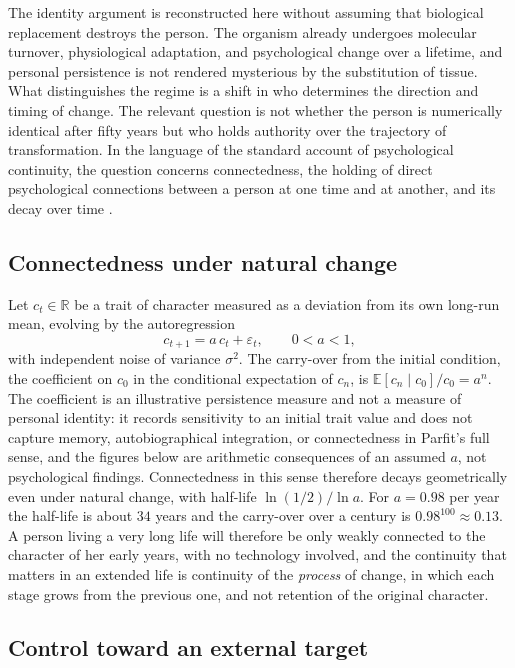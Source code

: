 \documentclass[11pt]{article}
\theoremstyle{plain}
\theoremstyle{definition}
\theoremstyle{remark}
\newcommand{\E}{\mathbb{E}}
\newcommand{\R}{\mathbb{R}}
\begin{document}
The identity argument is reconstructed here without assuming that biological replacement destroys the person. The organism already undergoes molecular turnover, physiological adaptation, and psychological change over a lifetime, and personal persistence is not rendered mysterious by the substitution of tissue. What distinguishes the regime is a shift in who determines the direction and timing of change. The relevant question is not whether the person is numerically identical after fifty years but who holds authority over the trajectory of transformation. In the language of the standard account of psychological continuity, the question concerns connectedness, the holding of direct psychological connections between a person at one time and at another, and its decay over time \cite{parfit1984}.

\subsection{Connectedness under natural change}

Let $c_t\in\R$ be a trait of character measured as a deviation from its own long-run mean, evolving by the autoregression
\begin{equation}\label{eq:ar1}
c_{t+1}=a\,c_t+\varepsilon_t,\qquad 0<a<1,
\end{equation}
with independent noise of variance $\sigma^2$. The carry-over from the initial condition, the coefficient on $c_0$ in the conditional expectation of $c_n$, is $\E[c_n\mid c_0]/c_0=a^n$. The coefficient is an illustrative persistence measure and not a measure of personal identity: it records sensitivity to an initial trait value and does not capture memory, autobiographical integration, or connectedness in Parfit's full sense, and the figures below are arithmetic consequences of an assumed $a$, not psychological findings. Connectedness in this sense therefore decays geometrically even under natural change, with half-life $\ln(1/2)/\ln a$. For $a=0.98$ per year the half-life is about $34$ years and the carry-over over a century is $0.98^{100}\approx0.13$. A person living a very long life will therefore be only weakly connected to the character of her early years, with no technology involved, and the continuity that matters in an extended life is continuity of the \emph{process} of change, in which each stage grows from the previous one, and not retention of the original character.

\subsection{Control toward an external target}
\end{document}
